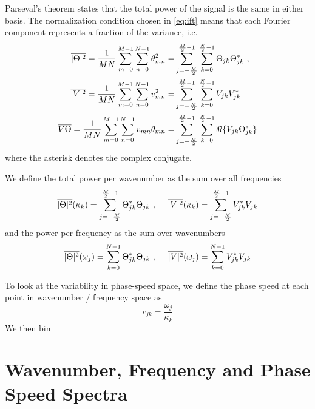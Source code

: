\documentclass[10pt]{article}
\newcommand{\ol}{\ensuremath{\overline}}
\begin{document}
Parseval's theorem states that the total power of the signal is the same in either basis. The normalization condition chosen in \eqref{eq:ift} means that each Fourier component represents a fraction of the variance, i.e. 
\begin{align}
\ol{|\Theta|^2} = \frac{1}{MN} \sum_{m=0}^{M-1} \sum_{n=0}^{N-1} \theta_{mn}^2 =& \sum_{j=-\frac{M}{2}}^{\frac{M}{2}-1} \sum_{k=0}^{\frac{N}{2}-1} \Theta_{jk}  \Theta_{jk}^\ast \ , \\ 
\ol{|V|^2} = \frac{1}{MN} \sum_{m=0}^{M-1} \sum_{n=0}^{N-1} v_{mn}^2 =& \sum_{j=-\frac{M}{2}}^{\frac{M}{2}-1} \sum_{k=0}^{\frac{N}{2}-1} V_{jk}  V_{jk}^\ast \\
\ol{V\Theta} = \frac{1}{MN} \sum_{m=0}^{M-1} \sum_{n=0}^{N-1} v_{mn} \theta_{mn} =& \sum_{j=-\frac{M}{2}}^{\frac{M}{2}-1} \sum_{k=0}^{\frac{N}{2}-1} \Re \{ V_{jk}  \Theta_{jk}^\ast \} \\
\end{align}
where the asterisk denotes the complex conjugate.

We define the total power per wavenumber as the sum over all frequencies
\begin{equation}
\ol{|\Theta|^2}(\kappa_k) = \sum_{j=-\frac{M}{2}}^{\frac{M}{2}-1} \Theta_{jk}^\ast  \Theta_{jk} \ , \ \ \ \ \ol{|V|^2}(\kappa_k) =  \sum_{j=-\frac{M}{2}}^{\frac{M}{2}-1} V_{jk}^\ast  V_{jk}
\end{equation}
and the power per frequency as the sum over wavenumbers
\begin{equation}
\ol{|\Theta|^2}(\omega_j) = \sum_{k=0}^{N-1} \Theta_{jk}^\ast   \Theta_{jk} \ , \ \ \ \ \ol{|V|^2}(\omega_j) = \sum_{k=0}^{N-1} V_{jk}^\ast  V_{jk}
\end{equation}

To look at the variability in phase-speed space, we define the phase speed at each point in wavenumber / frequency space as
\begin{equation}
c_{jk} = \frac{\omega_j}{\kappa_k}
\end{equation}
We then bin



\section{Wavenumber, Frequency and Phase Speed Spectra}
\end{document}
